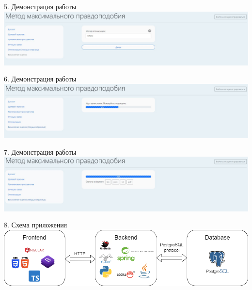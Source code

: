 \documentclass[aspectratio=169]{beamer}
\begin{document}
    \begin{frame}{5. Демонстрация работы}
        \centering
        \includegraphics[width=2.05\textheight]{src/web/5.jpg}
    \end{frame}
    \begin{frame}{6. Демонстрация работы}
        \centering
        \includegraphics[width=2.05\textheight]{src/web/6.jpg}
    \end{frame}
    \begin{frame}{7. Демонстрация работы}
        \centering
        \includegraphics[width=2.05\textheight]{src/web/7.jpg}
    \end{frame}
    
    \begin{frame}{8. Схема приложения}
        \centering
        \includegraphics[width=2.0\textheight]{src/схема_приложения.png}
    \end{frame}
\end{document}
